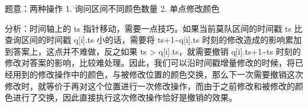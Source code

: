 题意：两种操作 1. 询问区间不同颜色数量 2. 单点修改颜色

分析：时间轴上的 ts 指针移动，需要一点技巧。如果当前莫队区间的时间戳 ts 比查询区间的时间戳 q[i].ts 小的话，需要将 ts+1\~{}q[i].ts 时刻的修改造成的影响累加到答案上，这点并不难做，反之如果 ts > q[i].ts，就需要撤销 q[i].ts+1\~{}ts 时刻的修改对答案的影响，比较难处理。因此，我们可以沿时间戳增量修改的时候，将已经用到的修改操作中的颜色，与被修改位置的颜色交换，那么下一次需要撤销这次修改时，就等价于再对这个位置进行一次修改操作，而由于之前修改和被修改的颜色进行了交换，因此直接执行这次修改操作恰好是撤销的效果。